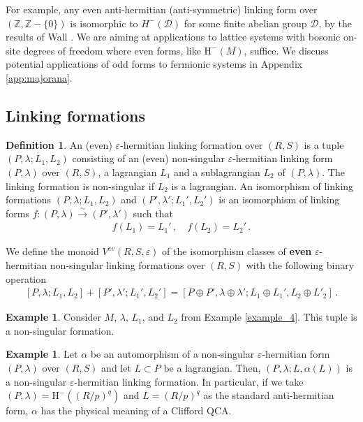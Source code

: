 \documentclass[sn-mathphys-num]{sn-jnl}
\theoremstyle{definition}
\newtheorem{definition}[lemma]{Definition}
\newtheorem{example}[lemma]{Example}
\numberwithin{equation}{section}
\theoremstyle{definition}
\def\CD {{\mathcal D}}
\def\CD {{\mathcal D}}
\def\h{{\mbox{H}}}
\def\hm{{\mbox{H}}^{-}}
\def\ep{\varepsilon}
\def\IZ{{\mathbb{Z}}}
\def\a{\alpha}
\def\l{{\lambda}}
\begin{document}
For example, any even anti-hermitian (anti-symmetric) linking form over $(\IZ,\IZ-\{0\})$ is isomorphic to $H^{-}(\CD)$ for some finite abelian group $\CD$, by the results of Wall \cite{WALL1963281}. We are aiming at applications to lattice systems with bosonic on-site degrees of freedom where even forms, like $\h^{-}(M)$, suffice. We discuss potential applications of odd forms to fermionic systems in Appendix \ref{app:majorana}. 

 
\subsection{Linking formations} 
\begin{definition}\label{def:linking_formation}
    An (even) $\ep$-hermitian linking formation over $(R,S)$ is a tuple $(P,\l;L_1,L_2)$ consisting of an (even) non-singular $\ep$-hermitian linking form $(P,\l)$ over $(R,S)$, a lagrangian $L_1$ and a sublagrangian $L_2$ of $(P,\l)$. The linking formation is non-singular if $L_2$ is a lagrangian. An isomorphism of linking formations $(P,\l;L_1,L_2)$ and $(P',\l';L_1',L_2')$ is an isomorphism of linking forms $f:(P,\l)\xrightarrow{\sim}(P',\l')$ such that
\begin{align}
    f(L_1)=L_1'\,,\quad f(L_2)=L_2'\,.
\end{align}
\end{definition}

 We define the monoid $V^{ev}(R,S,\ep)$ of the isomorphism classes of \textbf{even} $\ep$-hermitian non-singular linking formations over $(R,S)$ with the following binary operation
    \begin{align}\label{eq:direct_sum_formation}
        [P,\l;L_1,L_2]+[ P',\l';L_1',L_2']=[ P\oplus P',\l\oplus \l';L_1\oplus L_1',L_2\oplus L'_2]\,.
    \end{align}

\begin{example} Consider $M$, $\l$, $L_1$, and $L_2$ from Example \ref{example_4}. This tuple is a non-singular formation. \end{example}

\begin{example}
Let $\a$ be an automorphism of a non-singular $\ep$-hermitian form $(P,\l)$ over $(R,S)$ and let $L\subset P$ be a lagrangian. Then, $(P,\l;L,\a(L))$ is a non-singular $\ep$-hermitian linking formation. In particular, if we take $(P,\l)=\hm((R/p)^q)$ and $L=(R/p)^q$ as the standard anti-hermitian form, $\a$ has the physical meaning of a Clifford QCA. 
\end{example}
\end{document}
